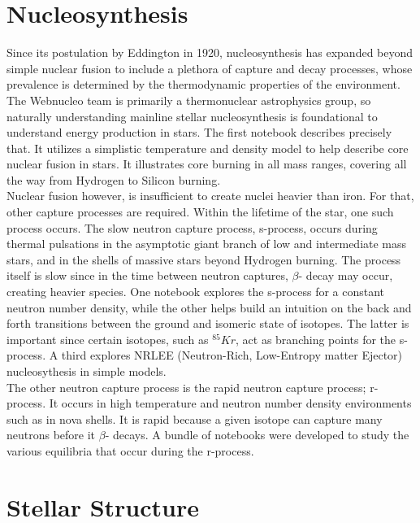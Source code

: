 \documentclass{article}
\begin{document}
\section*{Nucleosynthesis}

Since its postulation by Eddington in 1920, nucleosynthesis has expanded beyond simple nuclear fusion to include a plethora of 
capture and decay processes, whose prevalence is determined by the thermodynamic properties of the environment. The Webnucleo team 
is primarily a thermonuclear astrophysics group, so naturally understanding mainline stellar nucleosynthesis is foundational to 
understand energy production in stars. The first notebook describes precisely that. It utilizes a simplistic temperature and density 
model to help describe core nuclear fusion in stars. It illustrates core burning in all mass ranges, covering all the way from 
Hydrogen to Silicon burning.\\

Nuclear fusion however, is insufficient to create nuclei heavier than iron. For that, other capture processes are required. Within 
the lifetime of the star, one such process occurs. The slow neutron capture process, s-process, occurs during thermal pulsations in 
the asymptotic giant branch of low and intermediate mass stars, and in the shells of massive stars beyond Hydrogen burning. 
The process itself is slow since in the time between neutron captures, $\beta$- decay may occur, creating heavier species. One notebook 
explores the s-process for a constant neutron number density, while the other helps build an intuition on the back and forth transitions 
between the ground and isomeric state of isotopes. The latter is important since certain isotopes, such as $^{85}Kr$, act as branching 
points for the s-process. A third explores NRLEE (Neutron-Rich, Low-Entropy matter Ejector) nucleosythesis in simple models.\\

The other neutron capture process is the rapid neutron capture process; r-process. It occurs in high temperature and neutron number 
density environments such as in nova shells. It is rapid because a given isotope can capture many neutrons before it $\beta$- decays. 
A bundle of notebooks were developed to study the various equilibria that occur during the r-process.

\section*{Stellar Structure}
\end{document}

